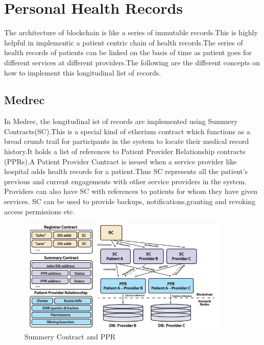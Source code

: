 \documentclass[12pt]{report}
\begin{document}
\section{Personal Health Records}
The architecture of blockchain is like a series of immutable records.This is highly helpful in implementic a patient centric chain of health records.The series of health records of patients can be linked on the basis of time as patient goes for different services at different providers.The following are the different concepts on how to implement this longitudinal list of records.
\subsection{Medrec}
In Medrec, the longitudinal ist of records are implemented using Summery Contracts(SC).This is a special kind of etherium contract which functions as a bread crumb trail for participants in the system to locate their medical record history.It holds a list of references to Patient Provider Relationship contracts (PPRs).A Patient Provider Contract is issued when a service provider like hospital adds health records for a patient.Thus SC represents all the patient's previous and current engagements with other service providers in the system. Providers can also have SC with references to patients for whom they have given services. SC can be used to provide backups, notifications,granting and revoking access permissions etc.
\begin{figure}[H]
\centering
\includegraphics[width=0.9\textwidth]{ppr.png}
\caption{Summery Contract and PPR}
\label{ppr}
\end{figure}
\end{document}
